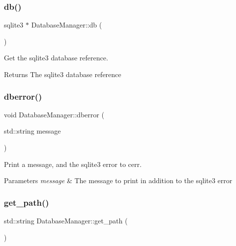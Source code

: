 \subsubsection{\texorpdfstring{db()}{db()}}
{\footnotesize\ttfamily sqlite3 $\ast$ Database\+Manager\+::db (\begin{DoxyParamCaption}{ }\end{DoxyParamCaption})}



Get the sqlite3 database reference. 

\begin{DoxyReturn}{Returns}
The sqlite3 database reference 
\end{DoxyReturn}
\mbox{\label{class_database_manager_a6fc3fa295292d8c873abb4a2f4e73e5b}} 
\subsubsection{\texorpdfstring{dberror()}{dberror()}}
{\footnotesize\ttfamily void Database\+Manager\+::dberror (\begin{DoxyParamCaption}\item[{std\+::string}]{message }\end{DoxyParamCaption})}



Print a message, and the sqlite3 error to cerr. 


\begin{DoxyParams}{Parameters}
{\em message} & The message to print in addition to the sqlite3 error \\
\hline
\end{DoxyParams}
\mbox{\label{class_database_manager_a623413cf45f53334a7cde7ed030c9620}} 
\subsubsection{\texorpdfstring{get\+\_\+path()}{get\_path()}}
{\footnotesize\ttfamily std\+::string Database\+Manager\+::get\+\_\+path (\begin{DoxyParamCaption}{ }\end{DoxyParamCaption})}




